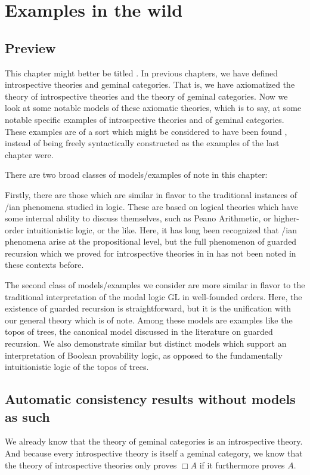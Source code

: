 \filestart

\section{Examples in the wild}

\subsection{Preview}
This chapter might better be titled . In previous chapters, we have defined introspective theories and geminal categories. That is, we have axiomatized the theory of introspective theories and the theory of geminal categories. Now we look at some notable models of these axiomatic theories, which is to say, at some notable specific examples of introspective theories and of geminal categories. These examples are of a sort which might be considered to have been found , instead of being freely syntactically constructed as the examples of the last chapter were.

There are two broad classes of models/examples of note in this chapter:

Firstly, there are those which are similar in flavor to the traditional instances of \Goedel/ian phenomena studied in logic. These are based on logical theories which have some internal ability to discuss themselves, such as Peano Arithmetic, or higher-order intuitionistic logic, or the like. Here, it has long been recognized that \Goedel/ian phenomena arise at the propositional level, but the full phenomenon of guarded recursion which we proved for introspective theories in \TODO in has not been noted in these contexts before.

The second class of models/examples we consider are more similar in flavor to the traditional interpretation of the modal logic GL in well-founded orders. Here, the existence of guarded recursion is straightforward, but it is the unification with our general theory which is of note. Among these models are examples like the topos of trees, the canonical model discussed in the literature on guarded recursion. We also demonstrate similar but distinct models which support an interpretation of Boolean provability logic, as opposed to the fundamentally intuitionistic logic of the topos of trees.

\subsection{Automatic consistency results without models as such}
We already know that the theory of geminal categories is an introspective theory. And because every introspective theory is itself a geminal category, we know that the theory of introspective theories only proves $\Box A$ if it furthermore proves $A$.

